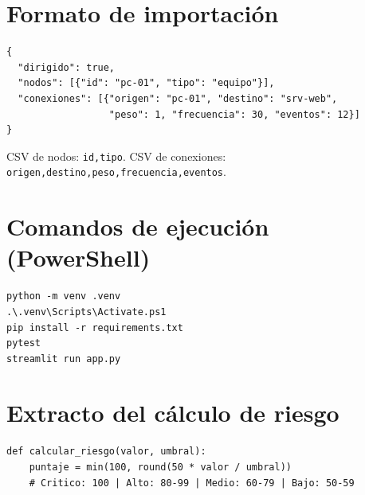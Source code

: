 \documentclass[12pt,a4paper]{article}
\begin{document}



\appendix
\section{Formato de importación}
\begin{lstlisting}
{
  "dirigido": true,
  "nodos": [{"id": "pc-01", "tipo": "equipo"}],
  "conexiones": [{"origen": "pc-01", "destino": "srv-web",
                  "peso": 1, "frecuencia": 30, "eventos": 12}]
}
\end{lstlisting}
CSV de nodos: \texttt{id,tipo}. CSV de conexiones: \texttt{origen,destino,peso,frecuencia,eventos}.

\section{Comandos de ejecución (PowerShell)}
\begin{lstlisting}
python -m venv .venv
.\.venv\Scripts\Activate.ps1
pip install -r requirements.txt
pytest
streamlit run app.py
\end{lstlisting}

\section{Extracto del cálculo de riesgo}
\begin{lstlisting}
def calcular_riesgo(valor, umbral):
    puntaje = min(100, round(50 * valor / umbral))
    # Critico: 100 | Alto: 80-99 | Medio: 60-79 | Bajo: 50-59
\end{lstlisting}
\end{document}
